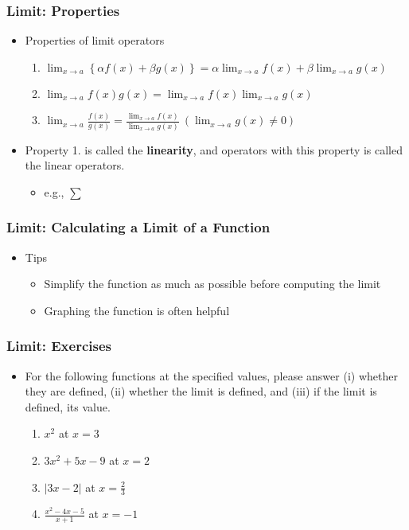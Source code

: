 \documentclass[pdflatex, 12pt]{beamer}
\begin{document}
\begin{frame}
\frametitle{Limit: Properties}
\begin{itemize}
\item Properties of limit operators
 \begin{enumerate}
 \item $\lim_{x \to a} \left\{\alpha f(x) + \beta g(x)\right\} = \alpha \lim_{x \to a} f(x) + \beta \lim_{x \to a} g(x)$
 \item $\lim_{x \to a} f(x)g(x) = \lim_{x \to a} f(x) \lim_{x \to a} g(x)$
 \item $\lim_{x \to a} \frac{f(x)}{g(x)} = \frac{\lim_{x \to a} f(x)}{\lim_{x \to a} g(x)} \ (\lim_{x \to a} g(x) \neq 0)$
 \end{enumerate}
\vspace{0.4cm}
\item Property 1. is called the \textbf{linearity}, and operators with this property is called the linear operators.
 \begin{itemize}
 \item e.g., $\sum$
 \end{itemize}
\end{itemize}
\end{frame}

\begin{frame}
\frametitle{Limit: Calculating a Limit of a Function}
\begin{itemize}
\item Tips
 \begin{itemize}
 \item Simplify the function as much as possible before computing the limit
 \item Graphing the function is often helpful
 \end{itemize}
\end{itemize}
\end{frame}

\begin{frame}
\frametitle{Limit: Exercises}
\begin{itemize}
\item For the following functions at the specified values, please answer (i) whether they are defined, (ii) whether the limit is defined, and (iii) if the limit is defined, its value.
 \begin{enumerate}
 \item $x^2$ at $x = 3$
 \item $3x^2 + 5x - 9$ at $x = 2$
 \item $|3x - 2|$ at $x = \frac{2}{3}$
 \vspace{0.1cm}
 \item $\frac{x^2 - 4x - 5}{x + 1}$ at $x = -1$
 \end{enumerate}
\end{itemize}
\end{frame}
\end{document}
